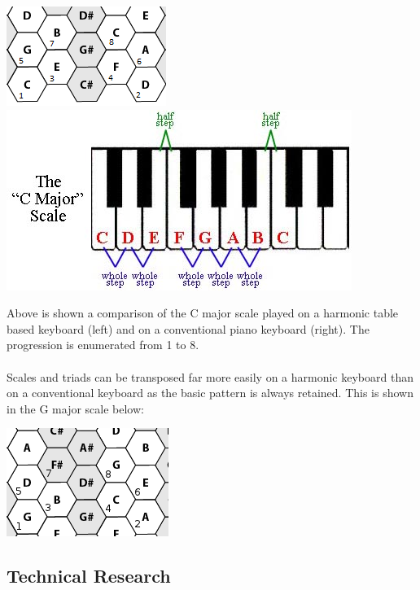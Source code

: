 \documentclass[10pt,a4paper]{article}
\begin{document}
\begin{center}
\includegraphics[scale=0.7]{scale.png}
\includegraphics[scale=1.5]{scale2.jpg}
\end{center}
Above is shown a comparison of the C major scale played on a harmonic table based keyboard (left) and on a conventional piano keyboard (right). The progression is enumerated from 1 to 8.\\
\\
Scales and triads can be transposed far more easily on a harmonic keyboard than on a conventional keyboard as the basic pattern is always retained. This is shown in the G major scale below:
\begin{center}
\includegraphics[scale=0.5]{scale3.png}
\end{center}

\subsection{Technical Research}
\end{document}
